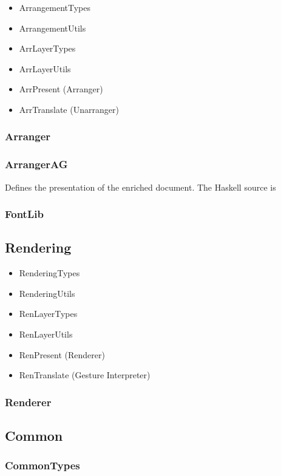 \documentclass[]{article}
\begin{document}
\begin{itemize}
\item ArrangementTypes
\item ArrangementUtils
\item ArrLayerTypes
\item ArrLayerUtils
\item ArrPresent (Arranger)
\item ArrTranslate (Unarranger)
\end{itemize}

\subsubsection{Arranger}
\subsubsection{ArrangerAG}

Defines the presentation of the enriched document. The Haskell source is 

\subsubsection{FontLib}


\subsection{Rendering}
\begin{itemize}
\item RenderingTypes
\item RenderingUtils
\item RenLayerTypes
\item RenLayerUtils
\item RenPresent (Renderer)
\item RenTranslate (Gesture Interpreter)
\end{itemize}

\subsubsection{Renderer}

\subsection{Common}

\subsubsection{CommonTypes}
\end{document}
